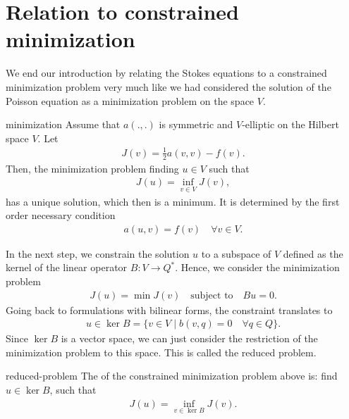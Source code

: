 \section{Relation to constrained minimization}

\begin{intro}
  We end our introduction by relating the Stokes equations to a
  constrained minimization problem very much like we had considered
  the solution of the Poisson equation as a minimization problem on
  the space $V$.
\end{intro}

\begin{Theorem}{minimization}
  Assume that $a(.,.)$ is symmetric and $V$-elliptic on the Hilbert
  space $V$. Let
  \begin{gather}
    J(v) = \tfrac12 a(v,v) - f(v).    
  \end{gather}
  Then, the minimization problem finding $u\in V$ such that
  \begin{align}
    J(u) =\inf_{v\in V} J(v),
  \end{align}
  has a unique solution, which then is a minimum. It is determined by
  the first order necessary condition
  \begin{gather*}
    a(u,v) = f(v) \quad\forall v\in V.
  \end{gather*}
\end{Theorem}

\begin{intro}
  In the next step, we constrain the solution $u$ to a subspace of $V$
  defined as the kernel of the linear operator $B: V\to Q^*$. Hence,
  we consider the minimization problem
  \begin{gather*}
    J(u) =\min J(v) \quad
    \text{subject to}\quad
    Bu = 0.
  \end{gather*}
  Going back to formulations with bilinear forms, the constraint
  translates to
  \begin{gather}
    u\in \ker B = \bigl\{ v\in V \;\big|\;
    b(v,q)=0 \quad\forall q\in Q\}.
  \end{gather}
  Since $\ker B$ is a vector space, we can just consider the
  restriction of the minimization problem to this space. This is
  called the reduced problem.
\end{intro}

\begin{Definition}{reduced-problem}
  The  of the constrained minimization problem
  above is: find $u\in \ker B$, such that
  \begin{gather}
    J(u) =\inf_{v\in \ker B} J(v).
  \end{gather}
\end{Definition}

